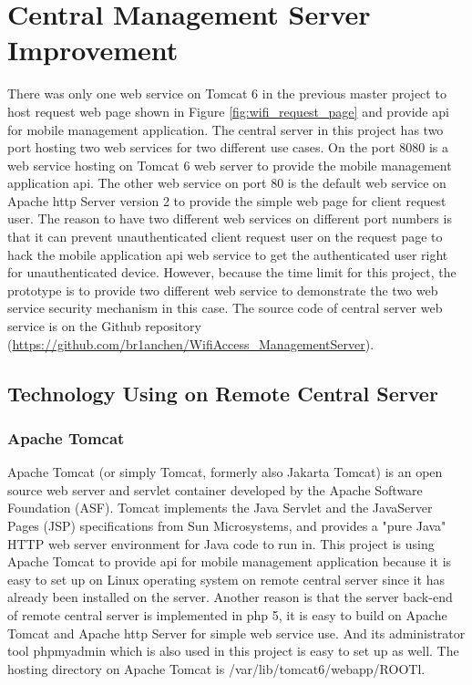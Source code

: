 \chapter{Central Management Server Improvement}
\label{chp:central_server}

\par There was only one web service on Tomcat 6 in the previous master project to host request web page shown in Figure \ref{fig:wifi_request_page} and provide \gls{api} for mobile management application. The central server in this project has two port hosting two web services for two different use cases.  On the port 8080 is a web service hosting on Tomcat 6 \cite{tomcat} web server to provide the mobile management application \gls{api}. The other web service on port 80 is the default web service on Apache \gls{http} Server \cite{apache} version 2 to provide the simple web page for client request user. The reason to have two different web services on different port numbers is that it can prevent unauthenticated client request user on the request page to hack the mobile application \gls{api} web service to get the authenticated user right for unauthenticated device. However, because the time limit for this project, the prototype is to provide two different web service to demonstrate the two web service security mechanism in this case. The source code of central server web service is on the Github repository (\url{https://github.com/br1anchen/WifiAccess_ManagementServer}).

\section{Technology Using on Remote Central Server}

\subsection{Apache Tomcat}
\par Apache Tomcat (or simply Tomcat, formerly also Jakarta Tomcat) is an open source web server and servlet container developed by the Apache Software Foundation (ASF). Tomcat implements the Java Servlet and the JavaServer Pages (JSP) specifications from Sun Microsystems, and provides a "pure Java" HTTP web server environment for Java code to run in. This project is using Apache Tomcat to provide \gls{api} for mobile management application because it is easy to set up on Linux operating system on remote central server since it has already been installed on the server. Another reason is that the server back-end of remote central server is implemented in \gls{php} 5, it is easy to build on Apache Tomcat and Apache \gls{http} Server for simple web service use. And its administrator tool phpmyadmin \cite{phpmyadmin} which is also used in this project is easy to set up as well. The hosting directory on Apache Tomcat is /var/lib/tomcat6/webapp/ROOTl.

